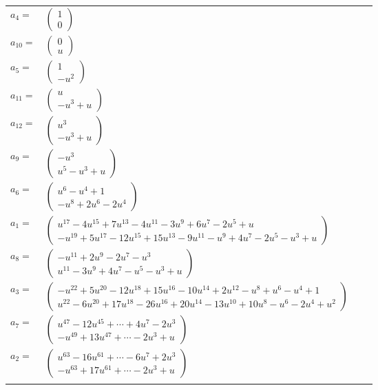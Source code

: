 \documentclass[1p]{elsarticle_modified}
\theoremstyle{definition}
\begin{document}
\begin{tabular}{m{7pt} m{180pt} m{7pt} m{180pt} }
\flushright $a_{4}=$&$\begin{pmatrix}1\\0\end{pmatrix}$ \\
\flushright $a_{10}=$&$\begin{pmatrix}0\\u\end{pmatrix}$ \\
\flushright $a_{5}=$&$\begin{pmatrix}1\\- u^2\end{pmatrix}$ \\
\flushright $a_{11}=$&$\begin{pmatrix}u\\- u^3+u\end{pmatrix}$ \\
\flushright $a_{12}=$&$\begin{pmatrix}u^3\\- u^3+u\end{pmatrix}$ \\
\flushright $a_{9}=$&$\begin{pmatrix}- u^3\\u^5- u^3+u\end{pmatrix}$ \\
\flushright $a_{6}=$&$\begin{pmatrix}u^6- u^4+1\\- u^8+2 u^6-2 u^4\end{pmatrix}$ \\
\flushright $a_{1}=$&$\begin{pmatrix}u^{17}-4 u^{15}+7 u^{13}-4 u^{11}-3 u^9+6 u^7-2 u^5+u\\- u^{19}+5 u^{17}-12 u^{15}+15 u^{13}-9 u^{11}- u^9+4 u^7-2 u^5- u^3+u\end{pmatrix}$ \\
\flushright $a_{8}=$&$\begin{pmatrix}- u^{11}+2 u^9-2 u^7- u^3\\u^{11}-3 u^9+4 u^7- u^5- u^3+u\end{pmatrix}$ \\
\flushright $a_{3}=$&$\begin{pmatrix}- u^{22}+5 u^{20}-12 u^{18}+15 u^{16}-10 u^{14}+2 u^{12}- u^8+u^6- u^4+1\\u^{22}-6 u^{20}+17 u^{18}-26 u^{16}+20 u^{14}-13 u^{10}+10 u^8- u^6-2 u^4+u^2\end{pmatrix}$ \\
\flushright $a_{7}=$&$\begin{pmatrix}u^{47}-12 u^{45}+\cdots+4 u^7-2 u^3\\- u^{49}+13 u^{47}+\cdots-2 u^3+u\end{pmatrix}$ \\
\flushright $a_{2}=$&$\begin{pmatrix}u^{63}-16 u^{61}+\cdots-6 u^7+2 u^3\\- u^{63}+17 u^{61}+\cdots-2 u^3+u\end{pmatrix}$\\&\end{tabular}
\end{document}
